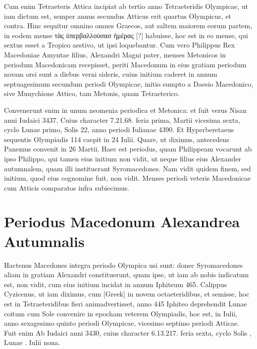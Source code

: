 Cum enim Tetraeteris Attica
incipiat ab tertio anno Tetraeteridis Olympicae, ut iam dictum est, semper
annus secundus Atticus erit quartus Olympicus, et contra.
Hinc
sequitur omnino omnes Graecos, aut saltem maiorem eorum partem,
in eodem mense \textgreek{τὰς ὑπερβαλλούσασ ἡμέρας [?]}
 habuisse, hoc est in eo
mense, qui sextus esset a Tropico aestivo, ut ipsi loquebantur.
Cum
vero Philippus Rex Macedoniae Amyntae filius, Alexandri Magni
pater, menses Metonicos in periodum Macedonicam recepisset,
periti Macedonum in eius gratiam periodum novam orsi sunt a diebus
verni sideris, cuius initium caderet in annum septuagesimum
secundum periodi Olympicae, initio sumpto a Daesio Macedonico,
sive Munychione Attico, tam Metonis, quam Tetraeterico.
\begin{table}[htbp]
  
\end{table}
Convenerunt enim in unum neomenia periodica et
Metonica: et fuit verus Nisan anni Iudaici
3437.
Cuius character 7.21.68. feria prima,
Martii vicesima sexta, cyclo Lunae primo,
Solis 22, anno periodi Iulianae 4390.
Et
Hyperberetaeus sequentis Olympiadis 114
caepit in 24 Iulii.
Quare, ut diximus, antecedens
Panemus convenit in 26 Martii.
Haec
est periodus, quam Philippeam vocarunt ab
ipso Philippo, qui tamen eius initium non
vidit, ut neque filius eius Alexander autumnalem,
quam illi instituerant Syromacedones.
Nam vidit quidem finem, sed initium, quod eius cognomine fuit, non
vidit.
Menses periodi veteris Macedonicae cum Atticis comparatos
infra subiecimus.

\section{Periodus Macedonum Alexandrea Autumnalis}

Hactenus Macedones integra periodo Olympica usi sunt: donec
Syromacedones aliam in gratiam Alexandri constituerunt,
quam ipse, ut iam ab nobis indicatum est, non vidit, cum eius initium
incidat in annum Iphiteum 465.
Calippus Cyzicenus, ut iam
diximus, cum \textgreek{[Greek]} in novem octaeteridibus, et
semisse, hoc est in  Tetraeteridibus fieri animadvertisset,
 anno 445
Iphiteo deprehendit Lunae coitum cum Sole convenire in epocham
veterem Olympiadis, hoc est, in  Iulii, anno sexagesimo
 quinto periodi
Olympicae, vicesimo septimo periodi Atticae.
Fuit enim Ab Iudaici
anni 3430, cuius character 6.13.217. feria sexta, cyclo Solis ,
Lunae . Iulii nona.

